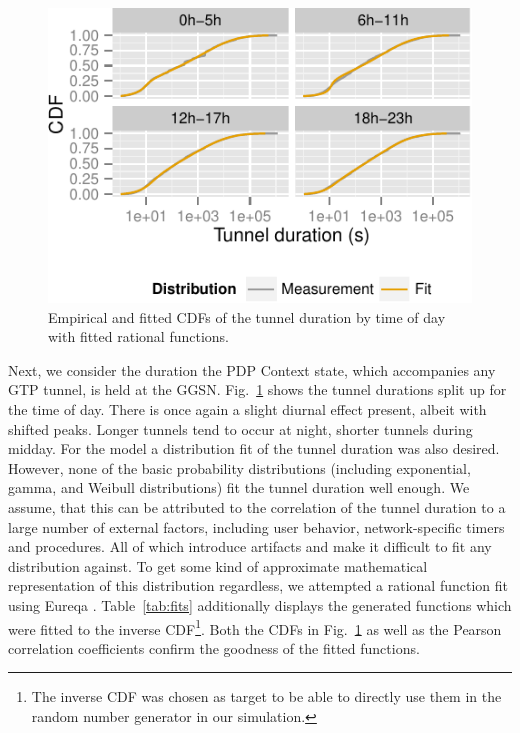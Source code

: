 \begin{figure}[htbp]
  \centering
  \includegraphics[width=1.0\columnwidth]{figures/timeslot-fits.pdf}
  \caption{Empirical and fitted CDFs of the tunnel duration by time of day with fitted rational functions.}
  \label{fig:fittedsdurationlots}
\end{figure}
Next, we consider the duration the \gls{PDP} Context state, which accompanies any \gls{GTP} tunnel, is held at the \gls{GGSN}.
Fig.~\ref{fig:fittedsdurationlots} shows the tunnel durations split up for the time of day. There is once again a slight diurnal effect present, albeit with shifted peaks. Longer tunnels tend to occur at night, shorter tunnels during midday.
For the model a distribution fit of the tunnel duration was also desired.
However, none of the basic probability distributions (including exponential, gamma, and Weibull distributions) fit the tunnel duration well enough.
We assume, that this can be attributed to the correlation of the tunnel duration to a large number of external factors, including user behavior, network-specific timers and procedures. All of which introduce artifacts and make it difficult to fit any distribution against.
To get some kind of approximate mathematical representation of this distribution regardless, we attempted a rational function fit using Eureqa \cite{eureqa_paper}.
Table~\ref{tab:fits} additionally displays the generated functions which were fitted to the inverse CDF\footnote{The inverse CDF was chosen as target to be able to directly use them in the random number generator in our simulation.}. 
Both the CDFs in Fig.~\ref{fig:fittedsdurationlots} as well as the Pearson correlation coefficients confirm the goodness of the fitted functions.
